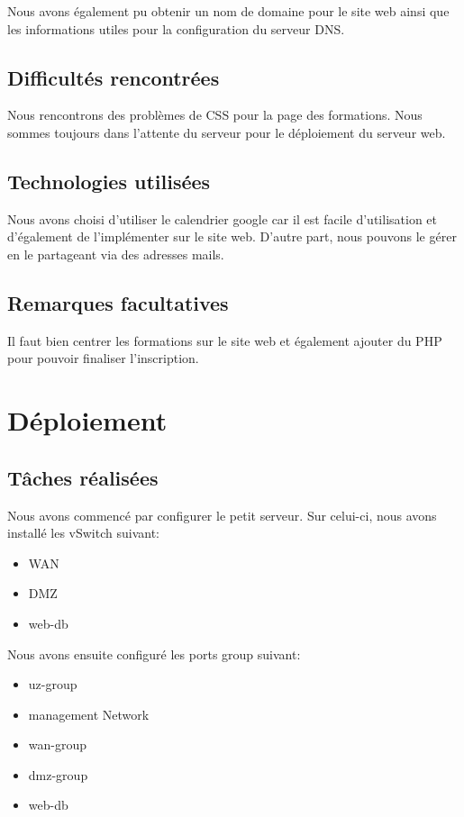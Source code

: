 \documentclass{article}
\begin{document}
        Nous avons également pu obtenir un nom de domaine pour le site web ainsi que les informations utiles pour la configuration du serveur DNS.
    \subsection{Difficultés rencontrées} 
        Nous rencontrons des problèmes de CSS pour la page des formations. Nous sommes toujours dans l'attente du serveur pour le déploiement du serveur web. 
    \subsection{Technologies utilisées}
       Nous avons choisi d'utiliser le calendrier google car il est facile d'utilisation et d'également de l'implémenter sur le site web. D'autre part, nous pouvons le gérer en le partageant via des adresses mails.
    \subsection{Remarques facultatives}
         Il faut bien centrer les formations sur le site web et également ajouter du PHP pour pouvoir finaliser l'inscription.
\section{Déploiement}
    \subsection{Tâches réalisées} 
       
       Nous avons commencé par configurer le petit serveur. Sur celui-ci, nous avons installé les vSwitch suivant:
       \begin{itemize}
           \item WAN
           \item DMZ
           \item web-db
       \end{itemize}
       
       Nous avons ensuite configuré les ports group suivant:
        \begin{itemize}
           \item uz-group
           \item management Network
           \item wan-group
           \item dmz-group
           \item web-db
       \end{itemize}
       
\end{document}
